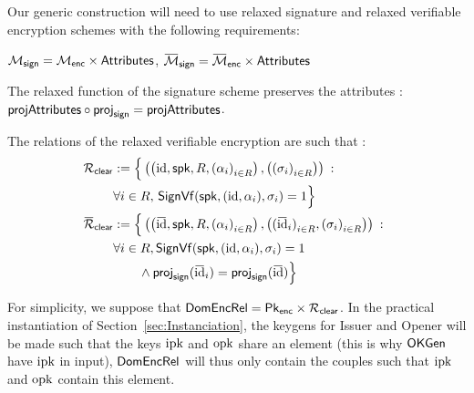 \label{sec:general_AC}
Our generic construction will need to use relaxed signature and relaxed verifiable encryption schemes
with the following requirements:
\begin{compactitem}
	\item $\mathcal{M}_{\mathsf{sign}} = \mathcal{M}_{\mathsf{enc}} \times \mathsf{Attributes}$, $\SetRelMessSign = \SetRelMessEnc \times \SetAttrAC$
	\item The relaxed function of the signature scheme preserves the attributes : $\proj{\SetAttrAC} \circ \projsign = \proj{\SetAttrAC}$.
	\item The relations of the relaxed verifiable encryption are such that :
		  \begin{align*}
\relationclear    & := \Big\{\left(\left(\identity, \spk, R, 
{(\alpha_i)}_{i \in R}\right),\left({(\sigma_i)}_{i \in R}\right)\right)\::\:
\hspace{0.1cm} \\ &\forall i \in R,\, \SignVf(\spk, (\identity,\alpha_i),
\signature_i) = 1 \Big\}                                                                                                                   \\ \barrelationclear & := \Big\{\left(\left(\baridentity, \spk, R, {(\alpha_i)}_{i \in R}\right),
\left({(\baridentity_i)}_{i \in R}, {(\signature_i)}_{i \in R}\right)\right)\::\:
\hspace{0.1cm} \\ &\forall i \in R, 
\SignVf(\spk, (\identity,\alpha_i), \signature_i) = 1 \\
& \hspace{7mm}\wedge \projsign(\baridentity_i) = \projsign(\baridentity) \Big\}
      \end{align*}
      \normalsize
	\item For simplicity, we suppose that  $\mathsf{DomEncRel} = \mathsf{Pk}_{\mathsf{enc}}
		\times \mathcal{R}_{\mathsf{clear}}$. In the
		practical instantiation of Section~\ref{sec:Instanciation}, the keygens for Issuer and
		Opener will be made such that the keys $\text{ipk}$ and $\text{opk}$ share an element (this is why
		 $\mathsf{OKGen}$ have $\text{ipk}$ in input),
		$\mathsf{DomEncRel}$ will thus only contain the couples such that $\text{ipk}$ and $\text{opk}$ contain this element.
\end{compactitem}

